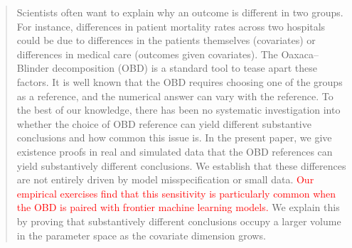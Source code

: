 \begin{abstract}
Scientists often want to explain why an outcome is different in two groups.
For instance, differences in patient mortality rates across two hospitals could be due to differences in the patients themselves (covariates) or differences in medical care (outcomes given covariates).
The Oaxaca--Blinder decomposition (OBD) is a standard tool to tease apart these factors.
It is well known that the OBD requires choosing one of the groups as a reference, and the numerical answer can vary with the reference.
To the best of our knowledge, there has been no systematic investigation into whether the choice of OBD reference can yield different substantive conclusions and how common this issue is.
In the present paper, we give existence proofs in real and simulated data that the OBD references can yield substantively different conclusions. 
We establish that these differences are not entirely driven by model misspecification or small data.
\textcolor{red}{Our empirical exercises find that this sensitivity is particularly common when the OBD is paired with frontier machine learning models.}
We explain this by proving that substantively different conclusions occupy a larger volume in the parameter space as the covariate dimension grows.
\end{abstract}
